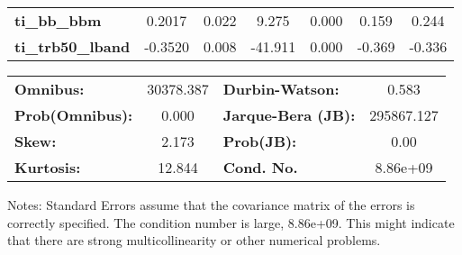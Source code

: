 \begin{center}
\begin{tabular}{lcccccc}
\textbf{ti\_bb\_bbm}        &       0.2017  &        0.022     &     9.275  &         0.000        &        0.159    &        0.244     \\
\textbf{ti\_trb50\_lband}   &      -0.3520  &        0.008     &   -41.911  &         0.000        &       -0.369    &       -0.336     \\
\bottomrule
\end{tabular}
\begin{tabular}{lclc}
\textbf{Omnibus:}       & 30378.387 & \textbf{  Durbin-Watson:     } &     0.583   \\
\textbf{Prob(Omnibus):} &    0.000  & \textbf{  Jarque-Bera (JB):  } & 295867.127  \\
\textbf{Skew:}          &    2.173  & \textbf{  Prob(JB):          } &      0.00   \\
\textbf{Kurtosis:}      &   12.844  & \textbf{  Cond. No.          } &  8.86e+09   \\
\bottomrule
\end{tabular}
\end{center}

Notes: \newline
 [1] Standard Errors assume that the covariance matrix of the errors is correctly specified. \newline
 [2] The condition number is large, 8.86e+09. This might indicate that there are \newline
 strong multicollinearity or other numerical problems.


